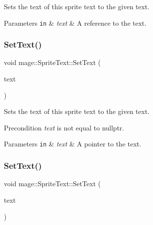 Sets the text of this sprite text to the given text.


\begin{DoxyParams}[1]{Parameters}
\mbox{\tt in}  & {\em text} & A reference to the text. \\
\hline
\end{DoxyParams}
\hypertarget{classmage_1_1_sprite_text_a03d5012e2812d422a1285a4a0abb104f}{}\label{classmage_1_1_sprite_text_a03d5012e2812d422a1285a4a0abb104f} 
\subsubsection{\texorpdfstring{Set\+Text()}{SetText()}\hspace{0.1cm}{\footnotesize\ttfamily [2/3]}}
{\footnotesize\ttfamily void mage\+::\+Sprite\+Text\+::\+Set\+Text (\begin{DoxyParamCaption}\item[{const wchar\+\_\+t $\ast$}]{text }\end{DoxyParamCaption})}

Sets the text of this sprite text to the given text.

\begin{DoxyPrecond}{Precondition}
{\itshape text} is not equal to {\ttfamily nullptr}. 
\end{DoxyPrecond}

\begin{DoxyParams}[1]{Parameters}
\mbox{\tt in}  & {\em text} & A pointer to the text. \\
\hline
\end{DoxyParams}
\hypertarget{classmage_1_1_sprite_text_a3ca23b77ab252f226d6525dfc2cb3d11}{}\label{classmage_1_1_sprite_text_a3ca23b77ab252f226d6525dfc2cb3d11} 
\subsubsection{\texorpdfstring{Set\+Text()}{SetText()}\hspace{0.1cm}{\footnotesize\ttfamily [3/3]}}
{\footnotesize\ttfamily void mage\+::\+Sprite\+Text\+::\+Set\+Text (\begin{DoxyParamCaption}\item[{const \hyperlink{structmage_1_1_color_string}{Color\+String} \&}]{text }\end{DoxyParamCaption})}

